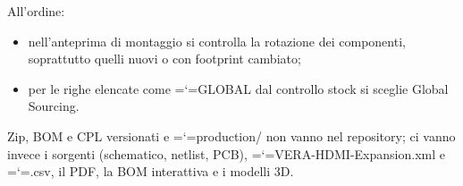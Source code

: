 \documentclass[11pt,a4paper]{article}
\makeatletter
\newcommand{\file}[1]{{\ttfamily\hyphenchar\font=`\-\relax\language=\l@nohyphenation #1}}
\makeatother
\begin{document}
All'ordine:

\begin{itemize}[leftmargin=*]
  \item nell'anteprima di montaggio si controlla la rotazione dei componenti,
        soprattutto quelli nuovi o con footprint cambiato;
  \item per le righe elencate come \file{GLOBAL} dal controllo stock si sceglie
        Global Sourcing.
\end{itemize}

Zip, BOM e CPL versionati e \file{production/} non vanno nel repository; ci
vanno invece i sorgenti (schematico, netlist, PCB),
\file{VERA-HDMI-Expansion.xml} e \file{.csv}, il PDF, la BOM interattiva e i
modelli 3D.
\end{document}
